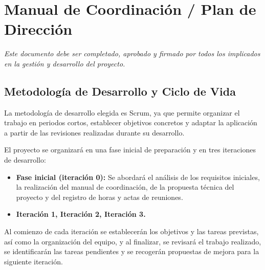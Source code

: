 

\section{Manual de Coordinación / Plan de Dirección}

\begin{small}
\textit{Este documento debe ser completado, aprobado y firmado por todos los implicados en la gestión y desarrollo del proyecto.}
\end{small}

\vspace{0.5em}

\subsection{Metodología de Desarrollo y Ciclo de Vida}

La metodología de desarrollo elegida es Scrum, ya que permite organizar el trabajo en periodos cortos, establecer objetivos concretos y adaptar la aplicación a partir de las revisiones realizadas durante su desarrollo.

El proyecto se organizará en una fase inicial de preparación y en tres iteraciones de desarrollo:

\begin{itemize}
    \item \textbf{Fase inicial (iteración 0):} Se abordará el análisis de los requisitos iniciales, la realización del manual de coordinación, de la propuesta técnica del proyecto y del registro de horas y actas de reuniones.
    \item \textbf{Iteración 1, Iteración 2, Iteración 3.}
\end{itemize}

Al comienzo de cada iteración se establecerán los objetivos y las tareas previstas, así como la organización del equipo, y al finalizar, se revisará el trabajo realizado, se identificarán las tareas pendientes y se recogerán propuestas de mejora para la siguiente iteración.


